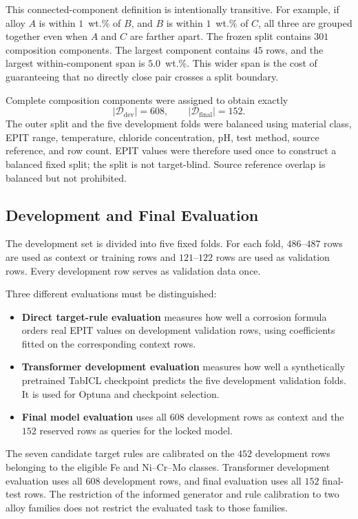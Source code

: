\documentclass{article}
\begin{document}
This connected-component definition is intentionally transitive. For example,
if alloy \(A\) is within \(1\)~wt.\% of \(B\), and \(B\) is within
\(1\)~wt.\% of \(C\), all three are grouped together even when \(A\) and
\(C\) are farther apart. The frozen split contains \(301\) composition
components. The largest component contains \(45\) rows, and the largest
within-component span is \(5.0\)~wt.\%. This wider span is the cost of
guaranteeing that no directly close pair crosses a split boundary.

Complete composition components were assigned to obtain exactly
\[
|\mathcal{D}_{\mathrm{dev}}|=608,
\qquad
|\mathcal{D}_{\mathrm{final}}|=152.
\]
The outer split and the five development folds were balanced using material
class, EPIT range, temperature, chloride concentration, pH, test method,
source reference, and row count. EPIT values were therefore used once to
construct a balanced fixed split; the split is not target-blind. Source
reference overlap is balanced but not prohibited.

\subsection{Development and Final Evaluation}

The development set is divided into five fixed folds. For each fold,
\(486\)--\(487\) rows are used as context or training rows and
\(121\)--\(122\) rows are used as validation rows. Every development row
serves as validation data once.

Three different evaluations must be distinguished:
\begin{itemize}
    \item \textbf{Direct target-rule evaluation} measures how well a corrosion
    formula orders real EPIT values on development validation rows, using
    coefficients fitted on the corresponding context rows.
    \item \textbf{Transformer development evaluation} measures how well a
    synthetically pretrained TabICL checkpoint predicts the five development
    validation folds. It is used for Optuna and checkpoint selection.
    \item \textbf{Final model evaluation} uses all \(608\) development rows
    as context and the \(152\) reserved rows as queries for the locked model.
\end{itemize}

The seven candidate target rules are calibrated on the \(452\) development
rows belonging to the eligible Fe and Ni--Cr--Mo classes. Transformer
development evaluation uses all \(608\) development rows, and final evaluation
uses all \(152\) final-test rows. The restriction of the informed generator
and rule calibration to two alloy families does not restrict the evaluated
task to those families.
\end{document}
